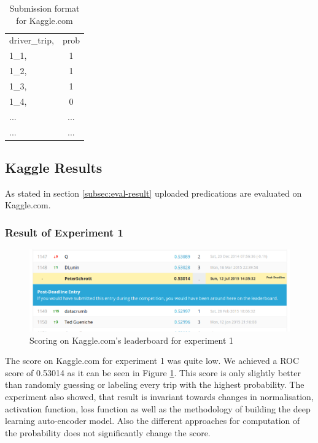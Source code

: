 \documentclass{vldb}
\begin{document}
\begin{table}
\centering
\begin{tabular}{l c}
driver\_trip, & prob\\
1\_1,& 1\\
1\_2,& 1\\
1\_3,& 1\\
1\_4,& 0\\
... & ... \\
... & ... \\
\end{tabular}
\caption{Submission format for Kaggle.com}
\label{table:kaggle-submission}
\end{table}


\subsection{Kaggle Results}

As stated in section \ref{subsec:eval-result} uploaded predications are evaluated on Kaggle.com. 


\subsubsection*{Result of Experiment 1}
\label{ssubsec:Res-e1}

\begin{figure}
\centering
\includegraphics[width=\linewidth]{"pics/kaggle-result-1"}
\caption{Scoring on Kaggle.com's leaderboard for experiment 1}
\label{fig:kaggle-result1}
\end{figure}

The score on Kaggle.com for experiment 1 was quite low. We achieved a ROC score of 0.53014 as it can be seen in Figure \ref{fig:kaggle-result1}. This score is only slightly better than randomly guessing or labeling every trip with the highest probability. The experiment also showed, that result is invariant towards changes in normalisation, activation function, loss function as well as the methodology of building the deep learning auto-encoder model. Also the different approaches for computation of the probability does not significantly change the score.
\end{document}
